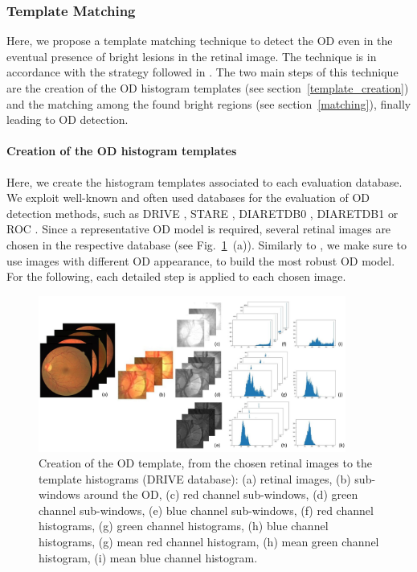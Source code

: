 \subsubsection{\label{template_matching}Template Matching}

Here, we propose a template matching technique to detect the OD even in the eventual presence of bright lesions in the retinal image. The technique is in accordance with the strategy followed in \citet{dehghani,wankhede}. The two main steps of this technique are the creation of the OD histogram templates (see \mbox{section \ref{template_creation}}) and the matching among the found bright regions (see \mbox{section \ref{matching}}), finally leading to OD detection.

\paragraph{\label{template_creation}Creation of the OD histogram templates}


Here, we create the histogram templates associated to each evaluation database. We exploit well-known and often used databases for the evaluation of OD detection methods, such as DRIVE \citep{drive}, STARE \citep{stare}, DIARETDB0 \citep{diaretdb0}, DIARETDB1 \citep{diaretdb1} or ROC \citep{roc}. Since a representative OD model is required, several retinal images are chosen in the respective database (see \mbox{Fig. \ref{crop_hist} (a)}). Similarly to \citet{dehghani,osareh}, we make sure to use images with different OD appearance, to build the most robust OD model. 
For the following, each detailed step is applied to each chosen image.

\begin{figure}[t]
	\centering
	
	\includegraphics[width=0.9\textwidth]{Images/Methode/Detection/full-template.JPG}
	
	\caption{\label{crop_hist}Creation of the OD template, from the chosen retinal images to the template histograms (DRIVE database): (a) retinal images, (b) sub-windows around the OD, (c) red channel sub-windows, (d) green channel sub-windows, (e) blue channel sub-windows, (f) red channel histograms, (g) green channel histograms, (h) blue channel histograms, (g) mean red channel histogram, (h) mean green channel histogram, (i) mean blue channel histogram.}
\end{figure}


